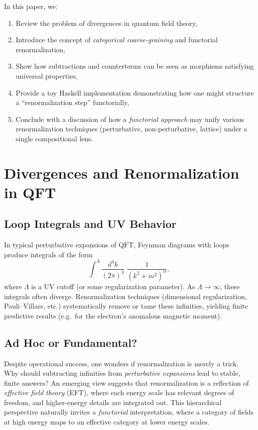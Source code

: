 \documentclass[12pt]{article}
\begin{document}
In this paper, we:

\begin{enumerate}[label=(\roman*)]
    \item Review the problem of divergences in quantum field theory,
    \item Introduce the concept of \emph{categorical coarse-graining} and functorial renormalization,
    \item Show how subtractions and counterterms can be seen as morphisms satisfying universal properties,
    \item Provide a toy Haskell implementation demonstrating how one might structure a “renormalization step” functorially,
    \item Conclude with a discussion of how a \emph{functorial approach} may unify various renormalization techniques 
    (perturbative, non-perturbative, lattice) under a single compositional lens.
\end{enumerate}

\section{Divergences and Renormalization in QFT}
\label{sec:renormQFT}

\subsection{Loop Integrals and UV Behavior}
In typical perturbative expansions of QFT, Feynman diagrams with loops produce integrals of the form
\begin{equation}\label{eq:loop}
\int^\Lambda \!\!\frac{d^4 k}{(2\pi)^4} \;\frac{1}{(k^2+m^2)^\alpha},
\end{equation}
where \(\Lambda\) is a UV cutoff (or some regularization parameter). As \(\Lambda \to \infty\), these integrals often diverge. 
Renormalization techniques (dimensional regularization, Pauli--Villars, etc.) systematically remove or tame these infinities, 
yielding finite predictive results (e.g.\ for the electron's anomalous magnetic moment).

\subsection{Ad Hoc or Fundamental?}
Despite operational success, one wonders if renormalization is merely a trick. 
Why should subtracting infinities from \emph{perturbative expansions} lead to stable, finite answers? 
An emerging view suggests that renormalization is a reflection of \emph{effective field theory} (EFT), 
where each energy scale has relevant degrees of freedom, and higher-energy details are integrated out. 
This hierarchical perspective naturally invites a \emph{functorial} interpretation, 
where a category of fields at high energy maps to an effective category at lower energy scales.
\end{document}
